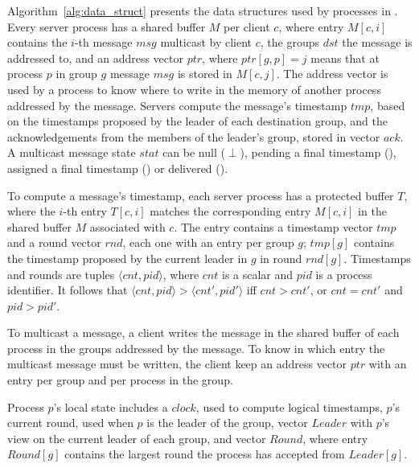 Algorithm~\ref{alg:data_struct} presents the data structures used by processes in \libname.
Every server process has a shared buffer $M$ per client $c$, where entry $M[c,i]$ contains the $i$-th message $msg$ multicast by client $c$, the groups $dst$ the message is addressed to, and an address vector $ptr$, where $ptr[g,p]=j$ means that at process $p$ in group $g$ message $msg$ is stored in $M[c,j]$. 
The address vector is used by a process to know where to write in the memory of another process addressed by the message.
Servers compute the message's timestamp $tmp$, based on the timestamps proposed by the leader of each destination group, and the acknowledgements from the members of the leader's group, stored in vector $ack$.
A multicast message state $stat$ can be null ($\perp$), pending a final timestamp (\mcast), assigned a final timestamp (\ordered) or delivered (\done).

To compute a message's timestamp, each server process has a protected buffer $T$, where the $i$-th entry $T[c,i]$ matches the corresponding entry $M[c,i]$ in the shared buffer $M$ associated with $c$.
The entry contains a timestamp vector $tmp$ and a round vector $rnd$, each one with an entry per group $g$; $tmp[g]$ contains the timestamp proposed by the current leader in $g$ in round $rnd[g]$.
Timestamps and rounds are tuples $\langle cnt,pid \rangle$, where $cnt$ is a scalar and $pid$ is a process identifier. It follows that $\langle cnt,pid \rangle > \langle cnt',pid' \rangle$ iff $cnt > cnt'$, or $cnt = cnt'$ and $pid > pid'$.

To multicast a message, a client writes the message in the shared buffer of each process in the groups addressed by the message.
To know in which entry the multicast message must be written, the client keep an address vector $ptr$ with an entry per group and per process in the group.

Process $p$'s local state includes a $clock$, used to compute logical timestamps, $p$'s current round, used when $p$ is the leader of the group, vector $Leader$ with $p$'s view on the current leader of each group, and vector $Round$, where entry $Round[g]$ contains the largest round the process has accepted from $Leader[g]$.











